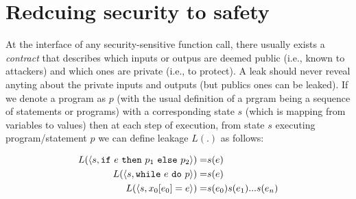 \section{Redcuing security to safety}





At the interface of any security-sensitive function call, there usually exists a
\emph{contract} that describes which inputs or outpus are deemed public (i.e.,
known to attackers) and which ones are private (i.e., to protect). A leak should
never reveal anyting about the private inputs and outputs (but publics ones 
can be leaked).
If we denote a program as $p$ (with the usual definition of a prgram being a
sequence of statements or programs) with a corresponding state $s$ (which
is mapping from variables to values) then at each step of execution, from
state $s$ executing program/statement $p$ we can define leakage $L(.)$ as follows:

\begin{equation}
    \begin{split}
    L(\langle s, \text{\texttt{if}}~e~\text{\texttt{then}}~p_1~\text{\texttt{else}}~p_2 \rangle) = & s(e) \\
    L(\langle s, \text{\texttt{while}}~e~\text{\texttt{do}}~p \rangle) = & s(e) \\
    L(\langle s, x_0[e_0] = e \rangle) = & s(e_0)s(e_1)...s(e_n)
    \end{split}
\end{equation}

